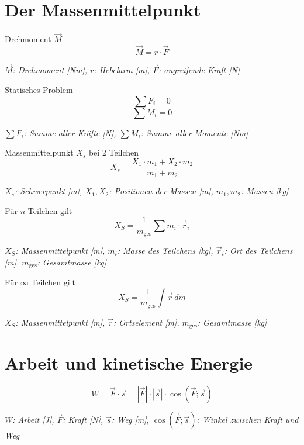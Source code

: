\documentclass[a5paper,10pt]{article}
\newenvironment{displayformula}
{
	\begin{framed}
		\color{formulaColor}
	}
	{\end{framed}}
\newcommand{\formulalegend}[1]{%
	\par\vspace{0.5ex}%
	{{\color{legendColor}\RaggedRight\small\textit{#1}}}%
	\par\vspace{1.5ex}%
}
\begin{document}
\section{Der Massenmittelpunkt}

\begin{displayformula}
	Drehmoment \( \vec{M} \)
	\[
	\vec{M} = r \cdot \vec{F}
	\]
\end{displayformula}
\formulalegend{
	\( \vec{M} \): Drehmoment [Nm], \( r \): Hebelarm [m], \( \vec{F} \): angreifende Kraft [N]
}

\begin{displayformula}
	Statisches Problem
	\[
	\sum F_i = 0
	\]
	\[
	\sum M_i = 0
	\]
\end{displayformula}
\formulalegend{
	\( \sum F_i \): Summe aller Kräfte [N], \( \sum M_i \): Summe aller Momente [Nm]
}

\begin{displayformula}
	Massenmittelpunkt \( X_s \) bei 2 Teilchen
	\[
	X_s = \frac{X_1 \cdot m_1 + X_2 \cdot m_2}{m_1 + m_2}
	\]
\end{displayformula}
\formulalegend{
	\( X_s \): Schwerpunkt [m], \( X_1, X_2 \): Positionen der Massen [m], \( m_1, m_2 \): Massen [kg]
}

\begin{displayformula}
	Für \( n \) Teilchen gilt
	\[
	X_S = \frac{1}{m_{\text{ges}}} \sum m_i \cdot \vec{r}_i
	\]
\end{displayformula}
\formulalegend{
	\( X_S \): Massenmittelpunkt [m], \( m_i \): Masse des Teilchens [kg], \( \vec{r}_i \): Ort des Teilchens [m], \( m_{\text{ges}} \): Gesamtmasse [kg]
}

\begin{displayformula}
	Für \( \infty \) Teilchen gilt
	\[
	X_S = \frac{1}{m_{\text{ges}}} \int \vec{r} \, dm
	\]
\end{displayformula}
\formulalegend{
	\( X_S \): Massenmittelpunkt [m], \( \vec{r} \): Ortselement [m], \( m_{\text{ges}} \): Gesamtmasse [kg]
}
\newpage


\section{Arbeit und kinetische Energie}

\begin{displayformula}
	\[
	W = \vec{F} \cdot \vec{s} = |\vec{F}| \cdot |\vec{s}| \cdot \cos(\vec{F}; \vec{s})
	\]
\end{displayformula}
\formulalegend{
	\( W \): Arbeit [J], \( \vec{F} \): Kraft [N], \( \vec{s} \): Weg [m], \( \cos(\vec{F}; \vec{s}) \): Winkel zwischen Kraft und Weg
}
\end{document}
